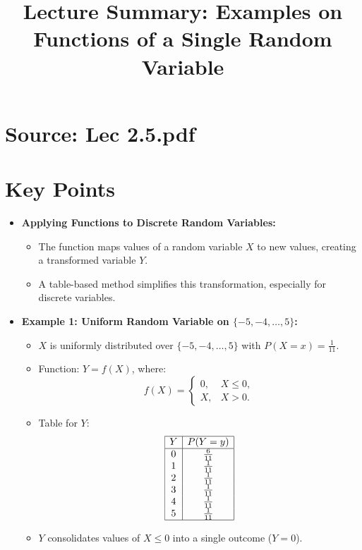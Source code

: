 \documentclass{article}
\title{Lecture Summary: Examples on Functions of a Single Random Variable}
\author{}
\date{}
\begin{document}
\maketitle

\section*{Source: Lec 2.5.pdf}

\section*{Key Points}

\begin{itemize}
  \item \textbf{Applying Functions to Discrete Random Variables:}
    \begin{itemize}
      \item The function maps values of a random variable $X$ to new values, creating a transformed variable $Y$.
      \item A table-based method simplifies this transformation, especially for discrete variables.
    \end{itemize}

  \item \textbf{Example 1: Uniform Random Variable on $\{-5, -4, \dots, 5\}$:}
    \begin{itemize}
      \item $X$ is uniformly distributed over $\{-5, -4, \dots, 5\}$ with $P(X = x) = \frac{1}{11}$.
      \item Function: $Y = f(X)$, where:
        \[
          f(X) =
          \begin{cases}
            0, & X \leq 0, \\
            X, & X > 0.
          \end{cases}
        \]
      \item Table for $Y$:
        \[
          \begin{array}{|c|c|}
            \hline
            Y & P(Y = y) \\ \hline
            0 & \frac{6}{11} \\
            1 & \frac{1}{11} \\
            2 & \frac{1}{11} \\
            3 & \frac{1}{11} \\
            4 & \frac{1}{11} \\
            5 & \frac{1}{11} \\ \hline
          \end{array}
        \]
      \item $Y$ consolidates values of $X \leq 0$ into a single outcome ($Y = 0$).
    \end{itemize}


\end{itemize}
\end{document}
